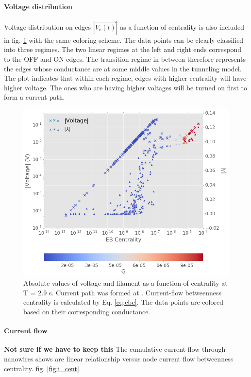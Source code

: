 \documentclass[%
 reprint,
 amsmath,amssymb,
 aps,
]{revtex4-2}
\begin{document}
\paragraph{Voltage distribution} 

Voltage distribution on edges $|\vec{V_e(t)}|$ as a function of centrality is also included in fig. \ref{fig:v_lam_cent} with the same coloring scheme. The data points can be clearly classified into three regimes. The two linear regimes at the left and right ends correspond to the OFF and ON edges. The transition regime in between therefore represents the edges whose conductance are at some middle values in the tunneling model. The plot indicates that within each regime, edges with higher centrality will have higher voltage. The ones who are having higher voltages will be turned on first to form a current path.

\begin{figure}[h]
	\centering
	\includegraphics[width=1\linewidth]{figure/v_lam_cent}
	\caption{Absolute values of voltage and filament as a function of centrality at T = 2.9 s. Current path was formed at . Current-flow betweenness centrality is calculated by Eq. \ref{eq:ebc}. The data points are colored based on their corresponding conductance.}
	\label{fig:v_lam_cent}
\end{figure}

\paragraph{Current flow}
\textbf{Not sure if we have  to keep this}
The cumulative current flow through nanowires shows are linear relationship versus node current flow betweenness centrality. fig. \ref{fig:i_cent}.
\end{document}
